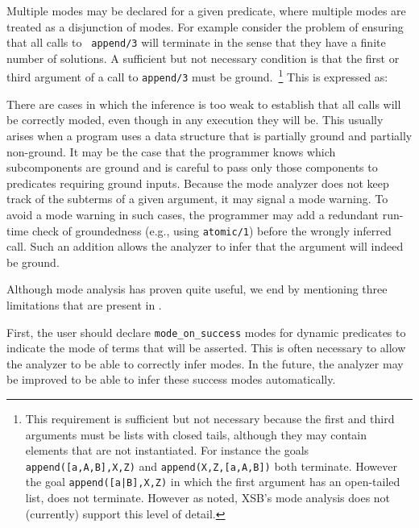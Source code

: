 \begin{description}
     Multiple modes may be declared for a given predicate, where
     multiple modes are treated as a disjunction of modes.  For
     example consider the problem of ensuring that all calls to {\tt
       append/3} will terminate in the sense that they have a finite
     number of solutions.  A sufficient but not necessary condition is
     that the first or third argument of a call to {\tt append/3} must
     be ground.~\footnote{This requirement is sufficient but not
       necessary because the first and third arguments must be lists
       with closed tails, although they may contain elements that are
       not instantiated.  For instance the goals {\tt
         append([a,A,B],X,Z)} and {\tt append(X,Z,[a,A,B])} both
       terminate.  However the goal {\tt append([a|B],X,Z)} in which
       the first argument has an open-tailed list, does not terminate.
       However as noted, XSB's mode analysis does not (currently)
       support this level of detail.}  This is expressed as:



        There are cases in which the inference is too weak to
        establish that all calls will be correctly moded, even though
        in any execution they will be.  This usually arises when a
        program uses a data structure that is partially ground and
        partially non-ground.  It may be the case that the programmer
        knows which subcomponents are ground and is careful to pass
        only those components to predicates requiring ground inputs.
        Because the mode analyzer does not keep track of the subterms
        of a given argument, it may signal a mode warning.  To avoid a
        mode warning in such cases, the programmer may add a redundant
        run-time check of groundedness (e.g., using {\tt atomic/1})
        before the wrongly inferred call.  Such an addition allows the
        analyzer to infer that the argument will indeed be ground.

        Although mode analysis has proven quite useful, we end by
        mentioning three limitations that are present in \version{}.

        First, the user should declare {\tt mode\_on\_success} modes
        for dynamic predicates to indicate the mode of terms that will
        be asserted.  This is often necessary to allow the analyzer to
        be able to correctly infer modes.  In the future, the analyzer
        may be improved to be able to infer these success modes
        automatically.


\end{description}
